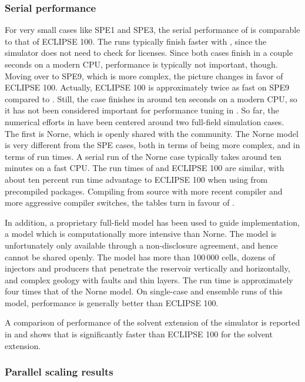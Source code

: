\subsubsection{Serial performance} \label{sec:serial-performance}
For very small cases like SPE1 and SPE3, the serial performance of \opmflow is comparable
to that of ECLIPSE 100. The runs typically finish faster with \opmflow, since the
simulator does not need to check for licenses. Since both cases finish in a couple seconds
on a modern CPU, performance is typically not important, though. Moving over to SPE9,
which is more complex, the picture changes in favor of ECLIPSE 100. Actually, ECLIPSE 100
is approximately twice as fast on SPE9 compared to \opmflow. Still, the case finishes in
around ten seconds on a modern CPU, so it has not been considered important for
performance tuning in \opmflow. So far, the numerical efforts in \opmflow have been
centered around two full-field simulation cases. The first is Norne, which is openly
shared with the community. The Norne model is very different from the SPE cases, both in
terms of being more complex, and in terms of run times. A serial run of the Norne
case typically takes around ten minutes on a fast CPU. The run times of \opmflow and
ECLIPSE 100 are similar, with about ten percent run time advantage to ECLIPSE 100 when
using \opmflow from precompiled packages. Compiling \opmflow from source with more recent
compiler and more aggressive compiler switches, the tables turn in favour of \opmflow.

In addition, a proprietary full-field model has been used to guide implementation, a model
which is computationally more intensive than Norne. The model is unfortunately only
available through a non-disclosure agreement, and hence cannot be shared openly. The model
has more than 100\,000 cells, dozens of injectors and producers that penetrate the
reservoir vertically and horizontally, and complex geology with faults and thin layers.
The run time is approximately four times that of the Norne model. On single-case and ensemble
runs of this model, \opmflow performance is generally better than ECLIPSE 100.

A comparison of performance of the solvent extension of the \opmflow simulator is reported
in \cite{sandve2018open} and shows that \opmflow is significantly faster than ECLIPSE 100
for the solvent extension.

\subsubsection{Parallel scaling results}

